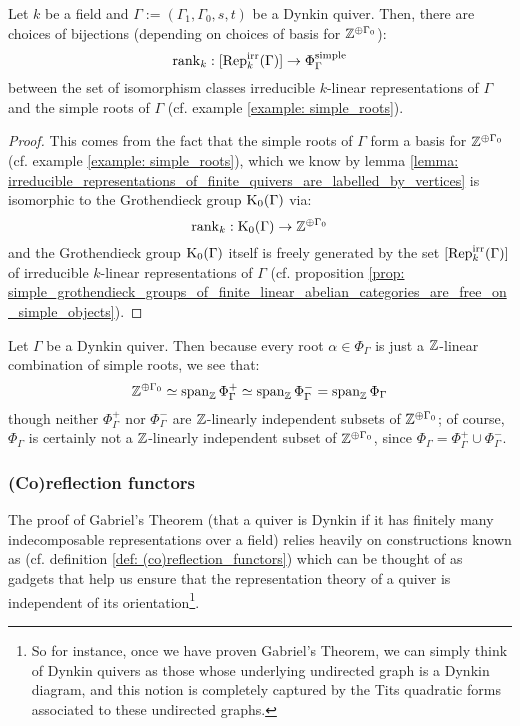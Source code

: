             \begin{proposition} \label{prop: irreducible_representations_of_dynkin_quivers_are_labelled_by_simple_roots}
                Let $k$ be a field and $\Gamma := (\Gamma_1, \Gamma_0, s, t)$ be a Dynkin quiver. Then, there are choices of bijections (depending on choices of basis for $\mathbb{Z}^{\oplus \Gamma_0}$):
                    $$\operatorname{rank}_k: [\mathrm{Rep}_k^{\mathrm{irr}}(\Gamma)] \to \Phi_{\Gamma}^{\mathrm{simple}}$$
                between the set of isomorphism classes irreducible $k$-linear representations of $\Gamma$ and the simple roots of $\Gamma$ (cf. example \ref{example: simple_roots}).
            \end{proposition}
                \begin{proof}
                    This comes from the fact that the simple roots of $\Gamma$ form a basis for $\mathbb{Z}^{\oplus \Gamma_0}$ (cf. example \ref{example: simple_roots}), which we know by lemma \ref{lemma: irreducible_representations_of_finite_quivers_are_labelled_by_vertices} is isomorphic to the Grothendieck group $\mathrm{K}_0(\Gamma)$ via:
                        $$\operatorname{rank}_k: \mathrm{K}_0(\Gamma) \to \mathbb{Z}^{\oplus \Gamma_0}$$
                    and the Grothendieck group $\mathrm{K}_0(\Gamma)$ itself is freely generated by the set $[\mathrm{Rep}_k^{\mathrm{irr}}(\Gamma)]$ of irreducible $k$-linear representations of $\Gamma$ (cf. proposition \ref{prop: simple_grothendieck_groups_of_finite_linear_abelian_categories_are_free_on_simple_objects}).
                \end{proof}
            \begin{remark}
                Let $\Gamma$ be a Dynkin quiver. Then because every root $\alpha \in \Phi_{\Gamma}$ is just a $\mathbb{Z}$-linear combination of simple roots, we see that:
                    $$\mathbb{Z}^{\oplus \Gamma_0} \simeq \operatorname{span}_{\mathbb{Z}} \Phi_{\Gamma}^+ \simeq \operatorname{span}_{\mathbb{Z}} \Phi_{\Gamma}^- = \operatorname{span}_{\mathbb{Z}} \Phi_{\Gamma}$$
                though neither $\Phi_{\Gamma}^+$ nor $\Phi_{\Gamma}^-$ are $\mathbb{Z}$-linearly independent subsets of $\mathbb{Z}^{\oplus \Gamma_0}$; of course, $\Phi_{\Gamma}$ is certainly not a $\mathbb{Z}$-linearly independent subset of $\mathbb{Z}^{\oplus \Gamma_0}$, since $\Phi_{\Gamma} = \Phi_{\Gamma}^+ \cup \Phi_{\Gamma}^-$.
            \end{remark}
            
        \subsubsection{(Co)reflection functors}
            The proof of Gabriel's Theorem (that a quiver is Dynkin if it has finitely many indecomposable representations over a field) relies heavily on constructions known as  (cf. definition \ref{def: (co)reflection_functors}) which can be thought of as gadgets that help us ensure that the representation theory of a quiver is independent of its orientation\footnote{So for instance, once we have proven Gabriel's Theorem, we can simply think of Dynkin quivers as those whose underlying undirected graph is a Dynkin diagram, and this notion is completely captured by the Tits quadratic forms associated to these undirected graphs.}. 
            
